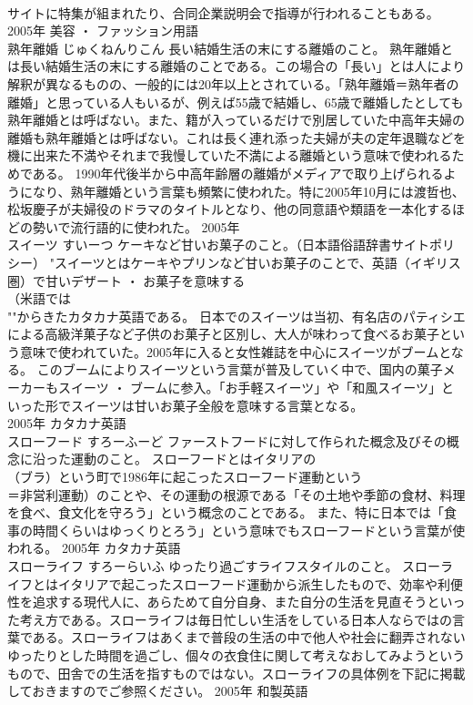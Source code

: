 \documentclass[8pt]{extreport}
\begin{document}
\begin{CJK}{UTF8}{min}
\\	サイトに特集が組まれたり、合同企業説明会で指導が行われることもある。	2005年	美容 ・ ファッション用語	
\\	熟年離婚	じゅくねんりこん	長い結婚生活の末にする離婚のこと。	熟年離婚とは長い結婚生活の末にする離婚のことである。この場合の「長い」とは人により解釈が異なるものの、一般的には20年以上とされている。「熟年離婚＝熟年者の離婚」と思っている人もいるが、例えば55歳で結婚し、65歳で離婚したとしても熟年離婚とは呼ばない。また、籍が入っているだけで別居していた中高年夫婦の離婚も熟年離婚とは呼ばない。これは長く連れ添った夫婦が夫の定年退職などを機に出来た不満やそれまで我慢していた不満による離婚という意味で使われるためである。 1990年代後半から中高年齢層の離婚がメディアで取り上げられるようになり、熟年離婚という言葉も頻繁に使われた。特に2005年10月には渡哲也、松坂慶子が夫婦役のドラマのタイトルとなり、他の同意語や類語を一本化するほどの勢いで流行語的に使われた。	2005年	
\\	スイーツ	すいーつ	ケーキなど甘いお菓子のこと。（日本語俗語辞書サイトポリシー）	"スイーツとはケーキやプリンなど甘いお菓子のことで、英語（イギリス圏）で甘いデザート ・ お菓子を意味する
\\	（米語では
\\	""からきたカタカナ英語である。 日本でのスイーツは当初、有名店のパティシエによる高級洋菓子など子供のお菓子と区別し、大人が味わって食べるお菓子という意味で使われていた。2005年に入ると女性雑誌を中心にスイーツがブームとなる。 このブームによりスイーツという言葉が普及していく中で、国内の菓子メーカーもスイーツ ・ ブームに参入。「お手軽スイーツ」や「和風スイーツ」といった形でスイーツは甘いお菓子全般を意味する言葉となる。
\\	2005年	カタカナ英語	
\\	スローフード	すろーふーど	ファーストフードに対して作られた概念及びその概念に沿った運動のこと。	スローフードとはイタリアの
\\	（ブラ）という町で1986年に起こったスローフード運動という
\\	＝非営利運動）のことや、その運動の根源である「その土地や季節の食材、料理を食べ、食文化を守ろう」という概念のことである。 また、特に日本では「食事の時間くらいはゆっくりとろう」という意味でもスローフードという言葉が使われる。	2005年	カタカナ英語	
\\	スローライフ	すろーらいふ	ゆったり過ごすライフスタイルのこと。	スローライフとはイタリアで起こったスローフード運動から派生したもので、効率や利便性を追求する現代人に、あらためて自分自身、また自分の生活を見直そうといった考え方である。スローライフは毎日忙しい生活をしている日本人ならではの言葉である。スローライフはあくまで普段の生活の中で他人や社会に翻弄されないゆったりとした時間を過ごし、個々の衣食住に関して考えなおしてみようというもので、田舎での生活を指すものではない。スローライフの具体例を下記に掲載しておきますのでご参照ください。	2005年	和製英語	

\end{CJK}
\end{document}
